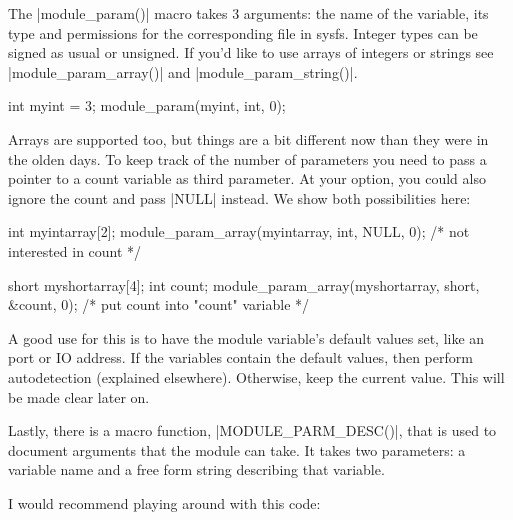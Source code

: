 \documentclass[10pt, oneside]{book}
\begin{document}
The \cpp|module_param()| macro takes 3 arguments: the name of the variable, its type and permissions for the corresponding file in sysfs.
Integer types can be signed as usual or unsigned. If you'd like to use arrays of integers or strings see \cpp|module_param_array()| and \cpp|module_param_string()|.

\begin{code}
int myint = 3;
module_param(myint, int, 0);
\end{code}

Arrays are supported too, but things are a bit different now than they were in the olden days.
To keep track of the number of parameters you need to pass a pointer to a count variable as third parameter. 
At your option, you could also ignore the count and pass \cpp|NULL| instead. We show both possibilities here:

\begin{code}
int myintarray[2];
module_param_array(myintarray, int, NULL, 0); /* not interested in count */

short myshortarray[4];
int count;
module_param_array(myshortarray, short, &count, 0); /* put count into "count" variable */
\end{code}

A good use for this is to have the module variable's default values set, like an port or IO address.
If the variables contain the default values, then perform autodetection (explained elsewhere). Otherwise, keep the current value.
This will be made clear later on.

Lastly, there is a macro function, \cpp|MODULE_PARM_DESC()|, that is used to document arguments that the module can take.
It takes two parameters: a variable name and a free form string describing that variable.


I would recommend playing around with this code:
\end{document}
